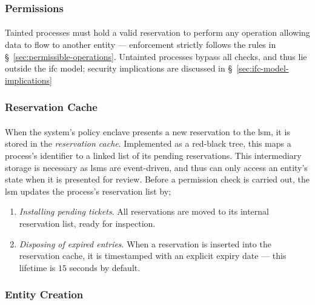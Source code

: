 \subsubsection{Permissions} 
\paragraph{} Tainted processes must hold a valid reservation to perform any operation allowing data to flow to another entity --- enforcement strictly follows the rules in §~\ref{sec:permissible-operations}. Untainted processes bypass all checks, and thus lie outside the \acrshort{ifc} model; security implications are discussed in §~\ref{sec:ifc-model-implications}


\subsubsection{Reservation Cache} 
\paragraph{} When the system's policy enclave presents a new reservation to the \acrshort{lsm}, it is stored in the \textit{reservation cache}. Implemented as a red-black tree, this maps a process's identifier to a linked list of its pending reservations. This intermediary storage is necessary as \acrshort{lsm}s are event-driven, and thus can only access an entity's state when it is presented for review. Before a permission check is carried out, the \acrshort{lsm} updates the process's reservation list by;
\begin{enumerate}
    \item \textit{Installing pending tickets}. All reservations are moved to its internal reservation list, ready for inspection.
    \item \textit{Disposing of expired entries}. When a reservation is inserted into the reservation cache, it is timestamped with an explicit expiry date --- this lifetime is $15$ seconds by default.  
\end{enumerate}


\subsubsection{Entity Creation}
\label{sec:entity-creation}
